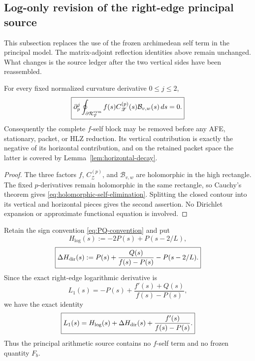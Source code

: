 \subsection{Log-only revision of the right-edge principal source}
\label{sec:logonly-source-revision}

This subsection replaces the use of the frozen archimedean self term in the
principal model.  The matrix-adjoint reflection identities above remain
unchanged.  What changes is the source ledger after the two vertical sides have
been reassembled.

\begin{lemma}
\label{lem:holomorphic-self-elimination}
For every fixed normalized curvature derivative $0\le j\le2$,
\begin{equation}
\boxed{
\partial_p^j\oint_{\partial\mathcal R_T^{\rm sym}}
 f(s)C_{\mathscr Z}^{(p)}(s)\mathcal B_{v,w}(s)\,ds=0.
}
\label{eq:holomorphic-self-elimination}
\end{equation}
Consequently the complete $f$-self block may be removed before any AFE,
stationary, packet, or HLZ reduction.  Its vertical contribution is exactly the
negative of its horizontal contribution, and on the retained packet space the
latter is covered by Lemma~\ref{lem:horizontal-decay}.
\end{lemma}

\begin{proof}
The three factors $f$, $C_{\mathscr Z}^{(p)}$, and $\mathcal B_{v,w}$ are
holomorphic in the high rectangle.  The fixed $p$-derivatives remain
holomorphic in the same rectangle, so Cauchy's theorem gives
\eqref{eq:holomorphic-self-elimination}.  Splitting the closed contour into its
vertical and horizontal pieces gives the second assertion.  No Dirichlet
expansion or approximate functional equation is involved.
\end{proof}

Retain the sign convention \eqref{eq:PQ-convention} and put
\begin{equation}
\boxed{
H_{\log}(s):=-2P(s)+P(s-2/L),
}
\label{eq:Hlog}
\end{equation}
\begin{equation}
\boxed{
\Delta H_{\rm dir}(s)
:=P(s)+\frac{Q(s)}{f(s)-P(s)}-P(s-2/L).
}
\label{eq:deltaH-dir}
\end{equation}
Since the exact right-edge logarithmic derivative is
\[
L_1(s)=-P(s)+\frac{f'(s)+Q(s)}{f(s)-P(s)},
\]
we have the exact identity
\begin{equation}
\boxed{
L_1(s)=H_{\log}(s)+\Delta H_{\rm dir}(s)
      +\frac{f'(s)}{f(s)-P(s)}.
}
\label{eq:L1-logonly-split}
\end{equation}
Thus the principal arithmetic source contains no $f$-self term and no frozen
quantity $F_b$.

